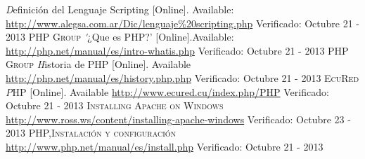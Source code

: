 \documentclass[11pt]{article} %
\begin{document}
\begin{thebibliography}{99}

\bibitem{[1]}  \textit Definición del Lenguaje Scripting [Online]. Available: \url{http://www.alegsa.com.ar/Dic/lenguaje%20scripting.php} Verificado: Octubre 21 - 2013
\bibitem{[2]}  \textsc{ PHP Group} \textit '¿Que es PHP?' [Online].Available: \url{http://php.net/manual/es/intro-whatis.php}  Verificado: Octubre 21 - 2013
\bibitem{[3]}  \textsc{ PHP Group} \textit Historia de PHP [Online]. Available \url{http://php.net/manual/es/history.php.php}  Verificado: Octubre 21 - 2013
\bibitem{[4]}  \textsc{ EcuRed} \textit PHP [Online]. Available \url{http://www.ecured.cu/index.php/PHP}  Verificado: Octubre 21 - 2013
\bibitem{[5]}  \textsc{Installing Apache on Windows} \url{http://www.ross.ws/content/installing-apache-windows}  Verificado: Octubre 23 - 2013
\bibitem{[6]}  \textsc{PHP,Instalación y configuración} \url{http://www.php.net/manual/es/install.php}  Verificado: Octubre 21 - 2013

\end{thebibliography}
\end{document}

